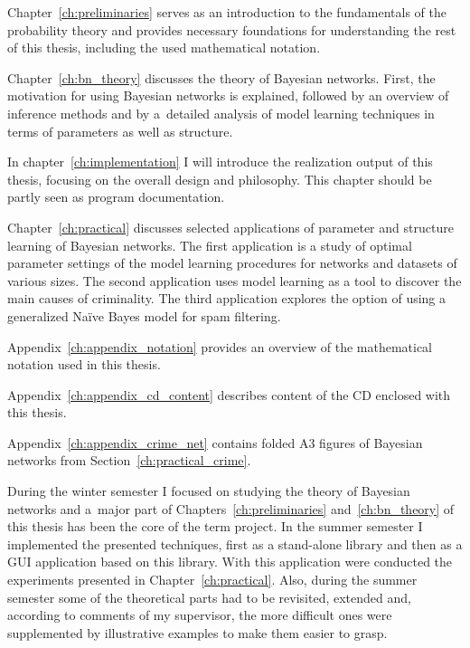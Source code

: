 \documentclass[english,cover]{fitthesis} %
\begin{document}
\medskip

Chapter~\ref{ch:preliminaries} serves as an introduction to the fundamentals of the probability theory and provides necessary foundations for understanding the rest of this thesis, including the used mathematical notation.

Chapter~\ref{ch:bn_theory} discusses the theory of Bayesian networks. First, the motivation for using Bayesian networks is explained, followed by an overview of inference methods and by a~detailed analysis of model learning techniques in terms of parameters as well as structure.

In chapter~\ref{ch:implementation} I will introduce the realization output of this thesis, focusing on the overall design and philosophy. This chapter should be partly seen as program documentation.

Chapter~\ref{ch:practical} discusses selected applications of parameter and structure learning of Bayesian networks. The first application is a study of optimal parameter settings of the model learning procedures for networks and datasets of various sizes. The second application uses model learning as a tool to discover the main causes of criminality. The third application explores the option of using a generalized Naïve Bayes model for spam filtering.

Appendix~\ref{ch:appendix_notation} provides an overview of the mathematical notation used in this thesis.

Appendix~\ref{ch:appendix_cd_content} describes content of the CD enclosed with this thesis.

Appendix~\ref{ch:appendix_crime_net} contains folded A3 figures of Bayesian networks from Section~\ref{ch:practical_crime}.

\medskip

During the winter semester I focused on studying the theory of Bayesian networks and a~major part of Chapters~\ref{ch:preliminaries} and~\ref{ch:bn_theory} of this thesis has been the core of the term project. In the summer semester I implemented the presented techniques, first as a stand-alone library and then as a GUI application based on this library. With this application were conducted the experiments presented in Chapter~\ref{ch:practical}. Also, during the summer semester some of the theoretical parts had to be revisited, extended and, according to comments of my supervisor, the more difficult ones were supplemented by illustrative examples to make them easier to grasp.
\end{document}
